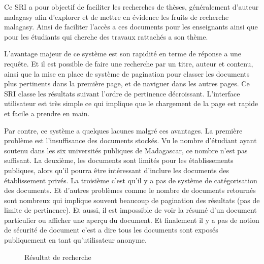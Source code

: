 Ce SRI a pour objectif de faciliter les recherches de thèses, généralement d'auteur malagasy afin d'explorer et de mettre en évidence les fruits de recherche malagasy. Ainsi de faciliter l'accès a ces documents pour les enseignants ainsi que pour les étudiants qui cherche des travaux rattachés a son thème.

L'avantage majeur de ce système est son rapidité en terme de réponse a une requête. Et il est possible de faire une recherche par un titre, auteur et contenu, ainsi que la mise en place de système de pagination pour classer les documents plus pertinents dans la première page, et de naviguer dans les autres pages. Ce SRI classe les résultats suivant l'ordre de pertinence décroissant. L'interface utilisateur est très simple ce qui implique que le chargement de la page est rapide et facile a prendre en main.

Par contre, ce système a quelques lacunes malgré ces avantages. La première problème est l'insuffisance des documents stockés. Vu le nombre d'étudiant ayant soutenu dans les six universités publiques de Madagascar, ce nombre n'est pas suffisant. La deuxième, les documents sont limités pour les établissements publiques, alors qu'il pourra être intéressant d'inclure les documents des établissement privés. La troisième c'est qu'il y a pas de système de catégorisation des documents. Et d'autres problèmes comme le nombre de documents retournés sont nombreux qui implique souvent beaucoup de pagination des résultats (pas de limite de pertinence). Et aussi, il est impossible de voir la résumé d'un document particulier ou afficher une aperçu du document. Et finalement il y a pas de notion de sécurité de document c'est a dire tous les documents sont exposés publiquement en tant qu'utilisateur anonyme.

\begin{figure}[htbp]
	\begin{center}
	\end{center}
	\caption{Résultat de recherche \citep{these-malgache-en-ligne}}\label{fig:resultat-tme}
\end{figure}

